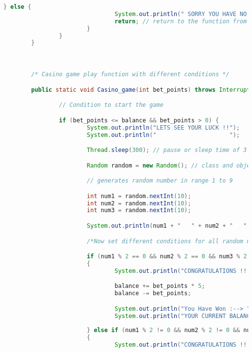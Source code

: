 \documentclass[]{article}
\begin{document}
\begin{lstlisting}[language=Java]
                        } else {
                                System.out.println(" SORRY YOU HAVE NO BALANCE ");
                                return; // return to the function from where it is being called
                        }
                }
        }



        /* Casino game play function with different conditions */

        public static void Casino_game(int bet_points) throws InterruptedException { 

                // Condition to start the game

                if (bet_points <= balance && bet_points > 0) {
                        System.out.println("LETS SEE YOUR LUCK !!");
                        System.out.println("                     ");

                        Thread.sleep(300); // pause or sleep time of 3 seconds

                        Random random = new Random(); // class and object to generate random no.

                        // generates random number in range 1 to 9

                        int num1 = random.nextInt(10);
                        int num2 = random.nextInt(10);
                        int num3 = random.nextInt(10);

                        System.out.println(num1 + "   " + num2 + "   " + num3 + "   ");

                        /*Now set different conditions for all random numbers */

                        if (num1 % 2 == 0 && num2 % 2 == 0 && num3 % 2 == 0) // all are even numbers
                        {
                                System.out.println("CONGRATULATIONS !!!!");

                                balance += bet_points * 5;
                                balance -= bet_points;

                                System.out.println("You Have Won :--> " + bet_points * 5);
                                System.out.println("YOUR CURRENT BALANCE --> " + balance);
                                
                        } else if (num1 % 2 != 0 && num2 % 2 != 0 && num3 % 2 != 0) // all are odd 
                        {
                                System.out.println("CONGRATULATIONS !!!!");


\end{lstlisting}
\end{document}
